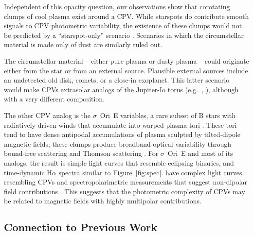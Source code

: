 \documentclass[11pt,twocolumn,tighten]{aastex7}
\begin{document}
Independent of this opacity question, our observations show that
corotating clumps of cool plasma exist around a CPV.  While starspots
do contribute smooth signals to CPV photometric variability, the
existence of these clumps  would not be predicted by a
``starspot-only'' scenario \citep{Koen2021}.  Scenarios in which the
circumstellar material is made only of dust are similarly ruled out.  

The circumstellar material -- either pure plasma or dusty plasma --
could originate either from the star or from an external source.
Plausible external sources include an undetected old disk, comets, or
a close-in exoplanet.  This latter scenario would make CPVs extrasolar
analogs of the Jupiter-Io torus (e.g.~\citealt{Bagenal1981},
\citealt{Kislyakova2018}), although with a very different composition.

The other CPV analog is the $\sigma$~Ori~E variables, a rare subset of
B stars with radiatively-driven winds that accumulate into warped
plasma tori \citep{Townsend2005}.  These tori tend to have dense
antipodal accumulations of plasma sculpted by tilted-dipole magnetic
fields; these clumps produce broadband optical variability through
bound-free scattering \citep{Townsend2005} and Thomson scattering
\citep{Berry2022}.  For $\sigma$~Ori~E and most of its analogs, the
result is simple light curves that resemble eclipsing binaries, and
time-dynamic H$\alpha$ spectra similar to Figure~\ref{fig:spec}. 
have complex
light curves resembling CPVs \citep{Mikulasek2020,Bouma2024} and
spectropolarimetric measurements that suggest non-dipolar field
contributions \citep{Kochukhov2011,Shultz2018}.  This suggests that
the photometric complexity of CPVs may be related to magnetic fields
with highly multipolar contributions.  


\subsection{Connection to Previous Work}
\end{document}
